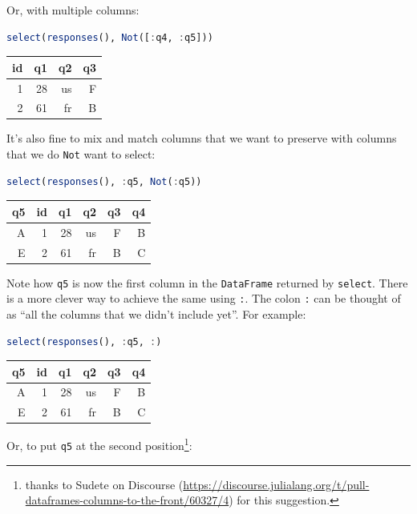 \documentclass[
  notoc %
]{tufte-book}
\newcommand{\passthrough}[1]{#1}
\begin{document}
Or, with multiple columns:

\begin{lstlisting}[language=Julia]
select(responses(), Not([:q4, :q5]))
\end{lstlisting}

\begin{longtable}[]{@{}rrrr@{}}
\toprule()
id & q1 & q2 & q3 \\
\midrule()
\endhead
1 & 28 & us & F \\
2 & 61 & fr & B \\
\bottomrule()
\end{longtable}

It's also fine to mix and match columns that we want to preserve with
columns that we do \passthrough{\lstinline!Not!} want to select:

\begin{lstlisting}[language=Julia]
select(responses(), :q5, Not(:q5))
\end{lstlisting}

\begin{longtable}[]{@{}rrrrrr@{}}
\toprule()
q5 & id & q1 & q2 & q3 & q4 \\
\midrule()
\endhead
A & 1 & 28 & us & F & B \\
E & 2 & 61 & fr & B & C \\
\bottomrule()
\end{longtable}

Note how \passthrough{\lstinline!q5!} is now the first column in the
\passthrough{\lstinline!DataFrame!} returned by
\passthrough{\lstinline!select!}. There is a more clever way to achieve
the same using \passthrough{\lstinline!:!}. The colon
\passthrough{\lstinline!:!} can be thought of as ``all the columns that
we didn't include yet''. For example:

\begin{lstlisting}[language=Julia]
select(responses(), :q5, :)
\end{lstlisting}

\begin{longtable}[]{@{}rrrrrr@{}}
\toprule()
q5 & id & q1 & q2 & q3 & q4 \\
\midrule()
\endhead
A & 1 & 28 & us & F & B \\
E & 2 & 61 & fr & B & C \\
\bottomrule()
\end{longtable}

Or, to put \passthrough{\lstinline!q5!} at the second
position\footnote{thanks to Sudete on Discourse
  (\url{https://discourse.julialang.org/t/pull-dataframes-columns-to-the-front/60327/4})
  for this suggestion.}:
\end{document}
